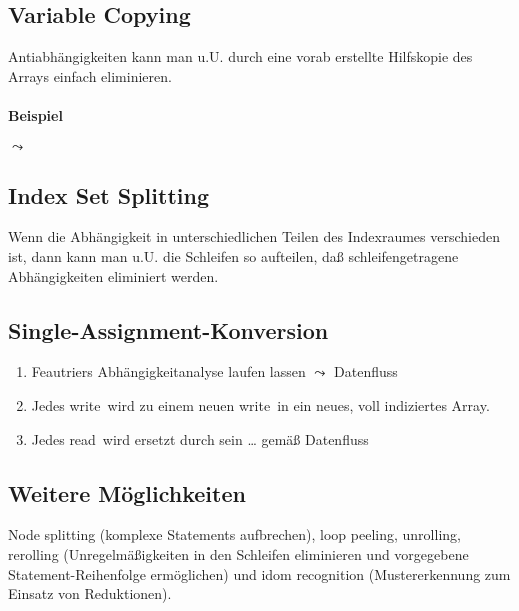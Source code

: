 \subsection{Variable Copying}
Antiabhängigkeiten kann man u.U. durch eine vorab erstellte Hilfskopie
des Arrays einfach eliminieren.

\paragraph{Beispiel}
\begin{minipage}{.4\textwidth}
\begin{procedure}[H]
\SetAlgoLined
{}
\end{procedure}
\end{minipage}
\qquad $\leadsto$ \qquad
\begin{minipage}{.5\textwidth}
\begin{procedure}[H]
\SetAlgoLined
{}
\end{procedure}

\begin{procedure}[H]
\SetAlgoLined
{}
\end{procedure}
\end{minipage}


\subsection{Index Set Splitting}
Wenn die Abhängigkeit in unterschiedlichen Teilen des Indexraumes
verschieden ist, dann kann man u.U. die Schleifen so aufteilen, daß
schleifengetragene Abhängigkeiten eliminiert werden.


\subsection{Single-Assignment-Konversion}
\begin{enumerate}
	\item Feautriers Abhängigkeitanalyse laufen lassen  \( \leadsto \) \glqq Datenfluss\grqq
	\item Jedes \glqq write\grqq\ wird zu einem neuen \glqq write\grqq\ in ein neues, voll indiziertes Array.
	\item Jedes \glqq read\grqq\ wird ersetzt durch sein \dots %
	gemäß Datenfluss
\end{enumerate}


\subsection{Weitere Möglichkeiten}
Node splitting (komplexe Statements aufbrechen), loop peeling,
unrolling, rerolling (Unregelmäßigkeiten in den Schleifen eliminieren
und vorgegebene Statement-Reihenfolge ermöglichen) und idom recognition
(Mustererkennung zum Einsatz von Reduktionen).
